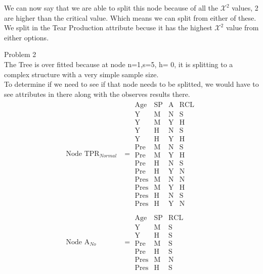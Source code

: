 \documentclass[12pt,english]{article}
\begin{document}
We can now say that we are able to split this node because of all the $\mathcal{X}^2$ values, 2 are higher than the critical value. Which means we can split from either of these. We split in the Tear Production attribute becuse it has the highest $\mathcal{X}^2$ value from either options.
\par
Problem 2\\
The Tree is over fitted because at node n=1,s=5, h= 0, it is splitting to a complex  structure with a very simple sample size.\\
To determine if we need to see if that node needs to be splitted, we would have to see attributes in there along with the observes results there.
\begin{equation}\tag{1}\label{eq:5}
\begin{split}
\mbox{Node TPR}_{Normal} &=
\begin{array}{c|c|c|c}
 \mbox{Age}  & \mbox{SP}& \mbox{A} & \mbox{RCL}\\
 \hline
 \mbox{Y}    & \mbox{M} & \mbox{N} & \mbox{S} \\
 \mbox{Y}    & \mbox{M} & \mbox{Y} & \mbox{H} \\
 \mbox{Y}    & \mbox{H} & \mbox{N} & \mbox{S} \\
 \mbox{Y}    & \mbox{H} & \mbox{Y} & \mbox{H} \\
 \mbox{Pre}  & \mbox{M} & \mbox{N} & \mbox{S} \\
 \mbox{Pre}  & \mbox{M} & \mbox{Y} & \mbox{H} \\
 \mbox{Pre}  & \mbox{H} & \mbox{N} & \mbox{S} \\
 \mbox{Pre}  & \mbox{H} & \mbox{Y} & \mbox{N} \\
 \mbox{Pres} & \mbox{M} & \mbox{N} & \mbox{N} \\
 \mbox{Pres} & \mbox{M} & \mbox{Y} & \mbox{H} \\
 \mbox{Pres} & \mbox{H} & \mbox{N} & \mbox{S} \\
 \mbox{Pres} & \mbox{H} & \mbox{Y} & \mbox{N} 
\end{array}
\\
\\
\mbox{Node A}_{No} &=
\begin{array}{c|c|c}
 \mbox{Age}  & \mbox{SP}& \mbox{RCL}\\
 \hline
 \mbox{Y}    & \mbox{M} & \mbox{S} \\
 \mbox{Y}    & \mbox{H} & \mbox{S} \\
 \mbox{Pre}  & \mbox{M} & \mbox{S} \\
 \mbox{Pre}  & \mbox{H} & \mbox{S} \\
 \mbox{Pres} & \mbox{M} & \mbox{N} \\
 \mbox{Pres} & \mbox{H} & \mbox{S} 
\end{array}
\end{split}
\end{equation}
\end{document}
